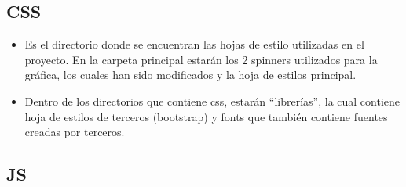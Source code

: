 \subsection{CSS} 
 
\begin{itemize}
	\item Es el directorio  donde se encuentran las hojas de estilo utilizadas en el proyecto. En la carpeta principal estarán los 2 spinners utilizados para la gráfica, los cuales han sido modificados y la hoja de estilos principal.

	\item Dentro de los directorios que contiene css, estarán “librerías”, la cual contiene hoja de estilos de terceros (bootstrap) y fonts que también contiene fuentes creadas por terceros.

\end{itemize}


\subsection{JS} 

